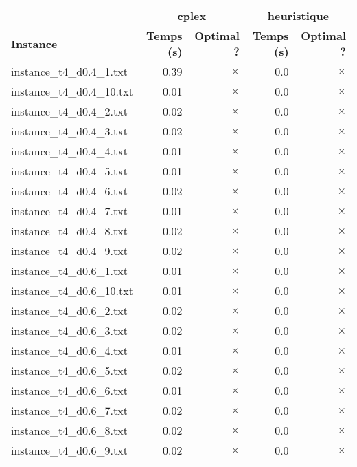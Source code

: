 \documentclass{article}
\begin{document}
\begin{center}
\renewcommand{\arraystretch}{1.4}
 \begin{tabular}{lrrrr}
	\hline
 & \multicolumn{2}{c}{\textbf{cplex}} & \multicolumn{2}{c}{\textbf{heuristique}}\\
\textbf{Instance}  & \textbf{Temps (s)} & \textbf{Optimal ?}  & \textbf{Temps (s)} & \textbf{Optimal ?} \\\hline

instance\_t4\_d0.4\_1.txt & 0.39 & 
$\times$
 & 0.0 & 
$\times$
\\
instance\_t4\_d0.4\_10.txt & 0.01 & 
$\times$
 & 0.0 & 
$\times$
\\
instance\_t4\_d0.4\_2.txt & 0.02 & 
$\times$
 & 0.0 & 
$\times$
\\
instance\_t4\_d0.4\_3.txt & 0.02 & 
$\times$
 & 0.0 & 
$\times$
\\
instance\_t4\_d0.4\_4.txt & 0.01 & 
$\times$
 & 0.0 & 
$\times$
\\
instance\_t4\_d0.4\_5.txt & 0.01 & 
$\times$
 & 0.0 & 
$\times$
\\
instance\_t4\_d0.4\_6.txt & 0.02 & 
$\times$
 & 0.0 & 
$\times$
\\
instance\_t4\_d0.4\_7.txt & 0.01 & 
$\times$
 & 0.0 & 
$\times$
\\
instance\_t4\_d0.4\_8.txt & 0.02 & 
$\times$
 & 0.0 & 
$\times$
\\
instance\_t4\_d0.4\_9.txt & 0.02 & 
$\times$
 & 0.0 & 
$\times$
\\
instance\_t4\_d0.6\_1.txt & 0.01 & 
$\times$
 & 0.0 & 
$\times$
\\
instance\_t4\_d0.6\_10.txt & 0.01 & 
$\times$
 & 0.0 & 
$\times$
\\
instance\_t4\_d0.6\_2.txt & 0.02 & 
$\times$
 & 0.0 & 
$\times$
\\
instance\_t4\_d0.6\_3.txt & 0.02 & 
$\times$
 & 0.0 & 
$\times$
\\
instance\_t4\_d0.6\_4.txt & 0.01 & 
$\times$
 & 0.0 & 
$\times$
\\
instance\_t4\_d0.6\_5.txt & 0.02 & 
$\times$
 & 0.0 & 
$\times$
\\
instance\_t4\_d0.6\_6.txt & 0.01 & 
$\times$
 & 0.0 & 
$\times$
\\
instance\_t4\_d0.6\_7.txt & 0.02 & 
$\times$
 & 0.0 & 
$\times$
\\
instance\_t4\_d0.6\_8.txt & 0.02 & 
$\times$
 & 0.0 & 
$\times$
\\
instance\_t4\_d0.6\_9.txt & 0.02 & 
$\times$
 & 0.0 & 
$\times$
\\

\end{tabular}
\end{center}
\end{document}
